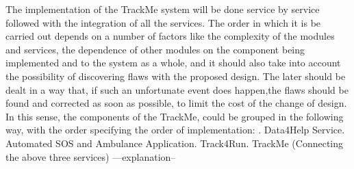 The implementation of the TrackMe system will be done service by service followed with the integration of all the services. The order in which it is be carried out depends on a number of factors like the complexity of the modules and services, the dependence of other modules on the component being implemented and to the system as a whole, and it should also take into account the possibility of discovering flaws with the proposed design. The later should be dealt in a way that, if such an unfortunate event does happen,the flaws should be found and corrected as soon as possible, to limit the cost of the change of design. 
In this sense, the components of the TrackMe, could be grouped in the following way, with the order specifying the order of implementation: . Data4Help Service. Automated SOS and Ambulance Application. Track4Run. TrackMe (Connecting the above three services)
---explanation--